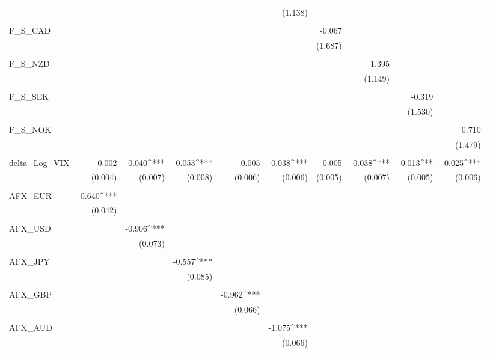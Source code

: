 \begin{table}[!htbp]
\begin{tabular}{@{\extracolsep{5pt}}lD{.}{.}{-3} D{.}{.}{-3} D{.}{.}{-3} D{.}{.}{-3} D{.}{.}{-3} D{.}{.}{-3} D{.}{.}{-3} D{.}{.}{-3} D{.}{.}{-3} }
  &  &  &  &  & (1.138) &  &  &  &  \\ 
  & & & & & & & & & \\ 
 F\_S\_CAD &  &  &  &  &  & -0.067 &  &  &  \\ 
  &  &  &  &  &  & (1.687) &  &  &  \\ 
  & & & & & & & & & \\ 
 F\_S\_NZD &  &  &  &  &  &  & 1.395 &  &  \\ 
  &  &  &  &  &  &  & (1.149) &  &  \\ 
  & & & & & & & & & \\ 
 F\_S\_SEK &  &  &  &  &  &  &  & -0.319 &  \\ 
  &  &  &  &  &  &  &  & (1.530) &  \\ 
  & & & & & & & & & \\ 
 F\_S\_NOK &  &  &  &  &  &  &  &  & 0.710 \\ 
  &  &  &  &  &  &  &  &  & (1.479) \\ 
  & & & & & & & & & \\ 
 delta\_Log\_VIX & -0.002 & 0.040^{***} & 0.053^{***} & 0.005 & -0.038^{***} & -0.005 & -0.038^{***} & -0.013^{**} & -0.025^{***} \\ 
  & (0.004) & (0.007) & (0.008) & (0.006) & (0.006) & (0.005) & (0.007) & (0.005) & (0.006) \\ 
  & & & & & & & & & \\ 
 AFX\_EUR & -0.640^{***} &  &  &  &  &  &  &  &  \\ 
  & (0.042) &  &  &  &  &  &  &  &  \\ 
  & & & & & & & & & \\ 
 AFX\_USD &  & -0.906^{***} &  &  &  &  &  &  &  \\ 
  &  & (0.073) &  &  &  &  &  &  &  \\ 
  & & & & & & & & & \\ 
 AFX\_JPY &  &  & -0.557^{***} &  &  &  &  &  &  \\ 
  &  &  & (0.085) &  &  &  &  &  &  \\ 
  & & & & & & & & & \\ 
 AFX\_GBP &  &  &  & -0.962^{***} &  &  &  &  &  \\ 
  &  &  &  & (0.066) &  &  &  &  &  \\ 
  & & & & & & & & & \\ 
 AFX\_AUD &  &  &  &  & -1.075^{***} &  &  &  &  \\ 
  &  &  &  &  & (0.066) &  &  &  &  \\ 
  & & & & & & & & & \\ 

\end{tabular}
\end{table}
